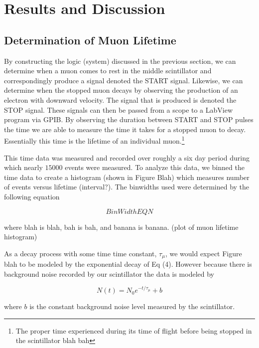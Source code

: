
\section{Results and Discussion}

\subsection{Determination of Muon Lifetime}

By constructing the logic (system) discussed in the previous section,
we can determine when a muon comes to rest in the middle scintillator
and correspondingly produce a signal denoted the START signal.
Likewise, we can determine when the stopped muon decays by observing
the production of an electron with downward velocity.  The signal that
is produced is denoted the STOP signal.  These signals can then be
passed from a scope to a LabView program via GPIB.  By observing the
duration between START and STOP pulses the time we are able to measure
the time it takes for a stopped muon to decay.  Essentially this time
is the lifetime of an individual muon.\footnote{The proper time
experienced during its time of flight before being stopped in the
scintillator blah bah}

This time data was measured and recorded over roughly a six day period
during which nearly $15000$ events were measured.  To analyze this
data, we binned the time data to create a histogram (shown in Figure
Blah) which measures number of events versus lifetime (interval?).
The binwidths used were determined by the following equation

\begin{equation}
Bin Width EQN
\end{equation}

where blah is blah, bah is bah, and banana is banana.  (plot of muon
lifetime histogram)

 As a decay process with some time time constant, $\tau_{\mu}$, we
would expect Figure blah to be modeled by the exponential decay of Eq
(4).  However because there is background noise recorded by our
scintillator the data is modeled by

\begin{equation}
N(t) = N_{0} e^{-t/\tau_{\mu}}+b
\end{equation}

where $b$ is the constant background noise level measured by the scintillator. 


